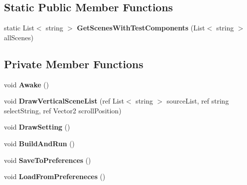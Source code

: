\subsection*{Static Public Member Functions}
\begin{DoxyCompactItemize}
\item 
\mbox{\label{class_unity_test_1_1_integration_tests_1_1_platform_runner_settings_window_a4e506635364e6c442d659e80293d79e6}} 
static List$<$ string $>$ {\bfseries Get\+Scenes\+With\+Test\+Components} (List$<$ string $>$ all\+Scenes)
\end{DoxyCompactItemize}
\subsection*{Private Member Functions}
\begin{DoxyCompactItemize}
\item 
\mbox{\label{class_unity_test_1_1_integration_tests_1_1_platform_runner_settings_window_a156b0486b2c0c0972046e99f68cf55c3}} 
void {\bfseries Awake} ()
\item 
\mbox{\label{class_unity_test_1_1_integration_tests_1_1_platform_runner_settings_window_acf97fa7a08be737101b3637e5a9cd1f3}} 
void {\bfseries Draw\+Vertical\+Scene\+List} (ref List$<$ string $>$ source\+List, ref string select\+String, ref Vector2 scroll\+Position)
\item 
\mbox{\label{class_unity_test_1_1_integration_tests_1_1_platform_runner_settings_window_a32d020955c37b25f36cf043d4eddc7f6}} 
void {\bfseries Draw\+Setting} ()
\item 
\mbox{\label{class_unity_test_1_1_integration_tests_1_1_platform_runner_settings_window_a16dd47c641b2288ac6dc58348e09259c}} 
void {\bfseries Build\+And\+Run} ()
\item 
\mbox{\label{class_unity_test_1_1_integration_tests_1_1_platform_runner_settings_window_a666aec3b82b730353538932b42bbe408}} 
void {\bfseries Save\+To\+Preferences} ()
\item 
\mbox{\label{class_unity_test_1_1_integration_tests_1_1_platform_runner_settings_window_aea8286df14cdfce01d7ddb623ed3334e}} 
void {\bfseries Load\+From\+Prefereneces} ()
\end{DoxyCompactItemize}

